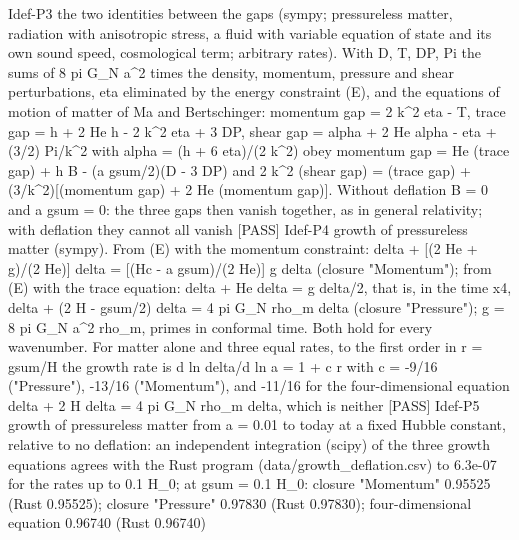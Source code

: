 \documentclass[
  10pt,
]{article}
\newenvironment{Shaded}{}{}
\newcommand{\NormalTok}[1]{#1}
\begin{document}
\begin{Shaded}
\begin{Highlighting}[]
\NormalTok{[PASS] Idef{-}P3  the two identities between the gaps (sympy; pressureless matter, radiation with anisotropic stress, a fluid with variable equation of state and its own sound speed, cosmological term; arbitrary rates). With D, T, DP, Pi the sums of 8 pi G\_N a\^{}2 times the density, momentum, pressure and shear perturbations, eta eliminated by the energy constraint (E), and the equations of motion of matter of Ma and Bertschinger: momentum gap = 2 k\^{}2 eta\textquotesingle{} {-} T, trace gap = h\textquotesingle{}\textquotesingle{} + 2 He h\textquotesingle{} {-} 2 k\^{}2 eta + 3 DP, shear gap = alpha\textquotesingle{} + 2 He alpha {-} eta + (3/2) Pi/k\^{}2 with alpha = (h\textquotesingle{} + 6 eta\textquotesingle{})/(2 k\^{}2) obey  momentum gap = He (trace gap) + h\textquotesingle{} B {-} (a gsum/2)(D {-} 3 DP)  and  2 k\^{}2 (shear gap) = (trace gap) + (3/k\^{}2)[(momentum gap)\textquotesingle{} + 2 He (momentum gap)].  Without deflation B = 0 and a gsum = 0: the three gaps then vanish together, as in general relativity; with deflation they cannot all vanish}
\NormalTok{[PASS] Idef{-}P4  growth of pressureless matter (sympy). From (E) with the momentum constraint: delta\textquotesingle{}\textquotesingle{} + [(2 He\textquotesingle{} + g)/(2 He)] delta\textquotesingle{} = [(Hc {-} a gsum)/(2 He)] g delta (closure "Momentum"); from (E) with the trace equation: delta\textquotesingle{}\textquotesingle{} + He delta\textquotesingle{} = g delta/2, that is, in the time x4, delta\textquotesingle{}\textquotesingle{} + (2 H {-} gsum/2) delta\textquotesingle{} = 4 pi G\_N rho\_m delta (closure "Pressure"); g = 8 pi G\_N a\^{}2 rho\_m, primes in conformal time. Both hold for every wavenumber. For matter alone and three equal rates, to the first order in r = gsum/H the growth rate is d ln delta/d ln a = 1 + c r with c = {-}9/16 ("Pressure"), {-}13/16 ("Momentum"), and {-}11/16 for the four{-}dimensional equation delta\textquotesingle{}\textquotesingle{} + 2 H delta\textquotesingle{} = 4 pi G\_N rho\_m delta, which is neither}
\NormalTok{[PASS] Idef{-}P5  growth of pressureless matter from a = 0.01 to today at a fixed Hubble constant, relative to no deflation: an independent integration (scipy) of the three growth equations agrees with the Rust program (data/growth\_deflation.csv) to 6.3e{-}07 for the rates up to 0.1 H\_0; at gsum = 0.1 H\_0: closure "Momentum" 0.95525 (Rust 0.95525); closure "Pressure" 0.97830 (Rust 0.97830); four{-}dimensional equation 0.96740 (Rust 0.96740)}

\end{Highlighting}
\end{Shaded}
\end{document}
